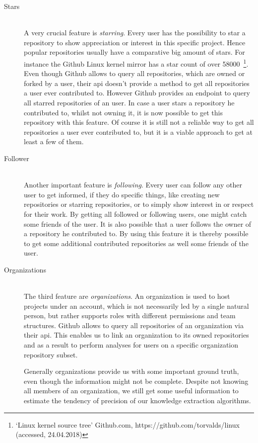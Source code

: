 \begin{description}
    \item[Stars] \hfill \\
        A very crucial feature is \emph{starring}. Every user has the possibility to star a repository to show appreciation or interest in this specific project.
        Hence popular repositories usually have a comparative big amount of stars. For instance the Github Linux kernel mirror has a star count of over 58000~\footnote{`Linux kernel source tree' Github.com, https://github.com/torvalds/linux (accessed, 24.04.2018)}.
        Even though Github allows to query all repositories, which are owned or forked by a user, their \ac{api} doesn't provide a method to get all repositories a user ever contributed to.
        However Github provides an endpoint to query all starred repositories of an user.
        In case a user stars a repository he contributed to, whilst not owning it, it is now possible to get this repository with this feature.
        Of course it is still not a reliable way to get all repositories a user ever contributed to, but it is a viable approach to get at least a few of them.

    \item[Follower] \hfill \\
        Another important feature is \emph{following}.
        Every user can follow any other user to get informed, if they do specific things, like creating new repositories or starring repositories, or to simply show interest in or respect for their work.
        By getting all followed or following users, one might catch some friends of the user.
        It is also possible that a user follows the owner of a repository he contributed to.
        By using this feature it is thereby possible to get some additional contributed repositories as well some friends of the user.

    \item[Organizations] \hfill \\
        The third feature are \emph{organizations}.
        An organization is used to host projects under an account, which is not necessarily led by a single natural person, but rather supports roles with different permissions and team structures.
        Github allows to query all repositories of an organization via their \ac{api}.
        This enables us to link an organization to its owned repositories and as a result to perform analyses for users on a specific organization repository subset.

        Generally organizations provide us with some important ground truth, even though the information might not be complete.
        Despite not knowing all members of an organization, we still get some useful information to estimate the tendency of precision of our knowledge extraction algorithms.
\end{description}
